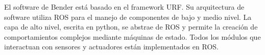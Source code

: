 El software de Bender est\'a basado en el framework URF. Su arquitectura de software utiliza  ROS para el manejo de componentes de bajo y medio nivel. La capa de alto nivel, escrita en python, se abstrae de ROS y permite la creaci\'on de comportamientos complejos mediante m\'aquinas de estado. Todos los m\'odulos que interactuan con sensores y actuadores est\'an implementados en ROS.


%





